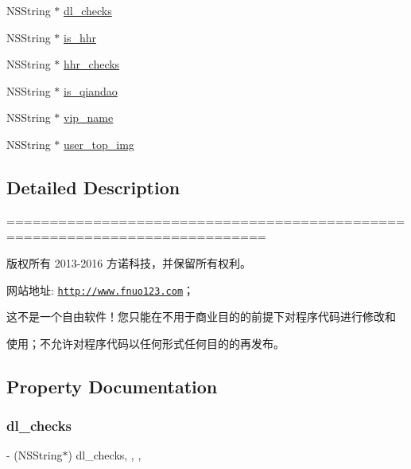 \begin{DoxyCompactItemize}
\item 
N\+S\+String $\ast$ \mbox{\hyperlink{interface_profile_model_a2dfd93a14660dc33e08783b346c20134}{dl\+\_\+checks}}
\item 
N\+S\+String $\ast$ \mbox{\hyperlink{interface_profile_model_a7048e9df8c690514cc0b445b2d5a7992}{is\+\_\+hhr}}
\item 
N\+S\+String $\ast$ \mbox{\hyperlink{interface_profile_model_a3f2b0141511ac8abb9a16d13e1176e22}{hhr\+\_\+checks}}
\item 
N\+S\+String $\ast$ \mbox{\hyperlink{interface_profile_model_a3a0cad8c80f46002275734592047b6d1}{is\+\_\+qiandao}}
\item 
N\+S\+String $\ast$ \mbox{\hyperlink{interface_profile_model_a2f9a51fafca570a20ceb90c590228982}{vip\+\_\+name}}
\item 
N\+S\+String $\ast$ \mbox{\hyperlink{interface_profile_model_af7ab3b60129092798f302dd302d5bf6f}{user\+\_\+top\+\_\+img}}
\end{DoxyCompactItemize}


\subsection{Detailed Description}
============================================================================

版权所有 2013-\/2016 方诺科技，并保留所有权利。

网站地址\+: \href{http://www.fnuo123.com}{\tt http\+://www.\+fnuo123.\+com}； 



这不是一个自由软件！您只能在不用于商业目的的前提下对程序代码进行修改和

使用；不允许对程序代码以任何形式任何目的的再发布。 

 

\subsection{Property Documentation}
\mbox{\label{interface_profile_model_a2dfd93a14660dc33e08783b346c20134}} 
\subsubsection{\texorpdfstring{dl\+\_\+checks}{dl\_checks}}
{\footnotesize\ttfamily -\/ (N\+S\+String$\ast$) dl\+\_\+checks\hspace{0.3cm}{\ttfamily [read]}, {\ttfamily [write]}, {\ttfamily [nonatomic]}, {\ttfamily [copy]}}

